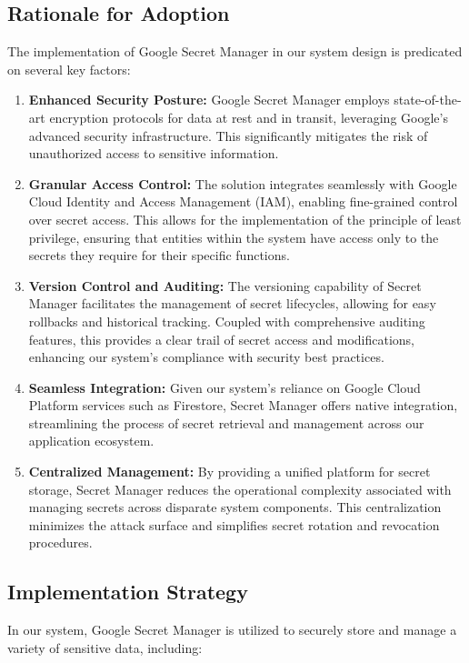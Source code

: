 \documentclass[a4paper, 12pt]{report}
\begin{document}
\subsection*{Rationale for Adoption}
The implementation of Google Secret Manager in our system design is predicated on several key factors:

\begin{enumerate}
    \item \textbf{Enhanced Security Posture:} Google Secret Manager employs state-of-the-art encryption protocols for data at rest and in transit, leveraging Google's advanced security infrastructure. This significantly mitigates the risk of unauthorized access to sensitive information.
    \item \textbf{Granular Access Control:} The solution integrates seamlessly with Google Cloud Identity and Access Management (IAM), enabling fine-grained control over secret access. This allows for the implementation of the principle of least privilege, ensuring that entities within the system have access only to the secrets they require for their specific functions.

    \item \textbf{Version Control and Auditing:} The versioning capability of Secret Manager facilitates the management of secret lifecycles, allowing for easy rollbacks and historical tracking. Coupled with comprehensive auditing features, this provides a clear trail of secret access and modifications, enhancing our system's compliance with security best practices.

    \item \textbf{Seamless Integration:} Given our system's reliance on Google Cloud Platform services such as Firestore, Secret Manager offers native integration, streamlining the process of secret retrieval and management across our application ecosystem.

    \item \textbf{Centralized Management:} By providing a unified platform for secret storage, Secret Manager reduces the operational complexity associated with managing secrets across disparate system components. This centralization minimizes the attack surface and simplifies secret rotation and revocation procedures.
\end{enumerate}

\subsection*{Implementation Strategy}
In our system, Google Secret Manager is utilized to securely store and manage a variety of sensitive data, including:
\end{document}
